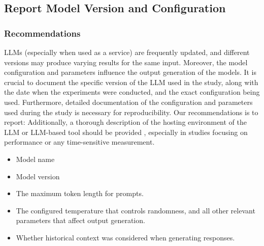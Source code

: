 



\subsection{Report Model Version and Configuration}

\subsubsection{Recommendations}

LLMs (especially when used as a service) are frequently updated, and different versions may produce varying results for the same input.
Moreover, the model configuration and parameters influence the output generation of the models.
It is crucial to document the specific version of the LLM used in the study, along with the date when the experiments were conducted, and the exact configuration being used. 
Furthermore, detailed documentation of the configuration and parameters used during the study is necessary for reproducibility. 
Our recommendations is to report: 
Additionally, a thorough description of the hosting environment of the LLM or LLM-based tool should be provided , especially in studies focusing on performance or any time-sensitive measurement. 

\begin{itemize}
\item Model name
\item Model version
\item The maximum token length for prompts.
\item The configured temperature that controls randomness, and all other relevant parameters that affect output generation.
\item Whether historical context was considered when generating responses.
\end{itemize}



